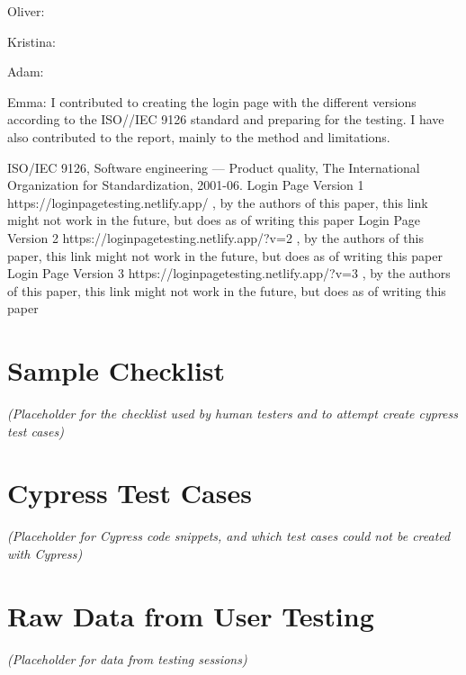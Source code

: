 \documentclass[journal,twocolumn]{IEEEtran}
\begin{document}
Oliver:

Kristina:

Adam:

Emma: I contributed to creating the login page with the different versions according to the ISO//IEC 9126 standard and preparing for the testing. I have also contributed to the report, mainly to the method and limitations.



\begin{thebibliography}{9}
     ISO/IEC 9126, Software engineering — Product quality, The International Organization for Standardization, 2001-06.
     Login Page Version 1 https://loginpagetesting.netlify.app/ , by the authors of this paper, this link might not work in the future, but does as of writing this paper
     Login Page Version 2 https://loginpagetesting.netlify.app/?v=2 , by the authors of this paper, this link might not work in the future, but does as of writing this paper
     Login Page Version 3 https://loginpagetesting.netlify.app/?v=3 , by the authors of this paper, this link might not work in the future, but does as of writing this paper
\end{thebibliography}

\appendices
\section{Sample Checklist}
\textit{(Placeholder for the checklist used by human testers and to attempt create cypress test cases)}

\section{Cypress Test Cases}
\textit{(Placeholder for Cypress code snippets, and which test cases could not be created with Cypress)}

\section{Raw Data from User Testing}
\textit{(Placeholder for data from testing sessions)}
\end{document}
